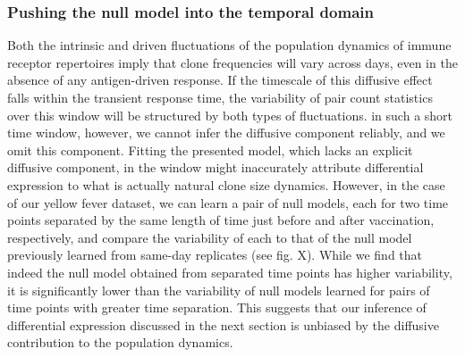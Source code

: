 \documentclass[letterpaper,english,prl,reprint,longbibliography]{revtex4-1} %
\begin{document}
\subsubsection*{Pushing the null model into the temporal domain}
Both the intrinsic and driven fluctuations of the population dynamics of immune receptor repertoires imply that clone frequencies will vary across days, even in the absence of any antigen-driven response. 
If the timescale of this diffusive effect falls within the transient response time, the variability of pair count statistics over this window will be structured by both types of fluctuations. 
in such a short time window, however, we cannot infer the diffusive component reliably, and we omit this component.
Fitting the presented model, which lacks an explicit diffusive component, in the window might inaccurately attribute differential expression to what is actually natural clone size dynamics. 
However, in the case of our yellow fever dataset, we can learn a pair of null models, each for two time points separated by the same length of time just before and after vaccination, respectively, and compare the variability of each to that of the null model previously learned from same-day replicates (see fig. X). 
While we find that indeed the null model obtained from separated time points has higher variability, it is significantly lower than the variability of null models learned for pairs of time points with greater time separation. 
This suggests that our inference of differential expression discussed in the next section is unbiased by the diffusive contribution to the population dynamics. 

\end{document}
